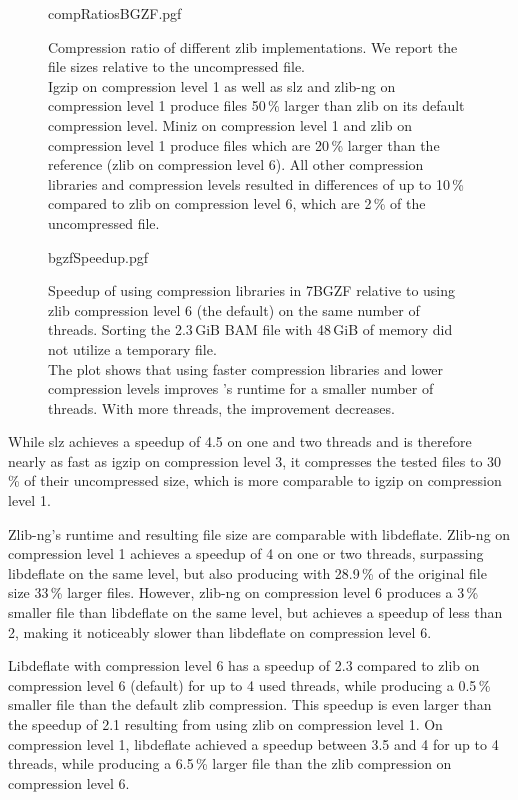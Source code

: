 \begin{figure}[!htb]
        {compRatiosBGZF.pgf}
    \caption{Compression ratio of different zlib implementations. We report the file sizes relative to the uncompressed file. \\
    Igzip on compression level 1 as well as slz and zlib-ng on compression level 1 produce files 50\,\% larger than zlib on its default compression level. Miniz on compression level 1 and zlib on compression level 1 produce files which are 20\,\% larger than the reference (zlib on compression level 6). All other compression libraries and compression levels resulted in differences of up to 10\,\% compared to zlib on compression level 6, which are 2\,\% of the uncompressed file.}
    \label{fig:bgzfComps}
\end{figure}
\begin{figure}[!htb]
        {bgzfSpeedup.pgf}
    \caption{Speedup of \sort using compression libraries in 7BGZF relative to \sort using zlib compression level 6 (the default) on the same number of threads.  Sorting the 2.3\,GiB BAM file with 48\,GiB of memory did not utilize a temporary file. \parents \threads \points \\
    The plot shows that using faster compression libraries and lower compression levels improves \sort's runtime for a smaller number of threads. With more threads, the improvement decreases.}
    \label{fig:bgzfspeed}
\end{figure}
While slz achieves a speedup of 4.5 on one and two threads  and is therefore nearly as fast as igzip on compression level 3, it compresses the tested files to 30\,\% of their uncompressed size, which is more comparable to igzip on compression level 1.

Zlib-ng's runtime and resulting file size are comparable with libdeflate. Zlib-ng on compression level 1 achieves a speedup of 4 on one or two threads, surpassing libdeflate on the same level, but also producing with 28.9\,\% of the original file size 33\,\% larger files. However, zlib-ng on compression level 6 produces a 3\,\% smaller file than libdeflate on the same level, but achieves a speedup of less than 2, making it noticeably slower than libdeflate on compression level 6. 

Libdeflate with compression level 6 has a speedup of 2.3 compared to zlib on compression level 6 (default) for up to 4 used threads, while producing a 0.5\,\% smaller file than the default zlib compression. This speedup is even larger than the speedup of 2.1 resulting from using zlib on compression level 1. On compression level 1, libdeflate achieved a speedup between 3.5 and 4 for up to 4 threads, while producing a 6.5\,\% larger file than the zlib compression on compression level 6.


